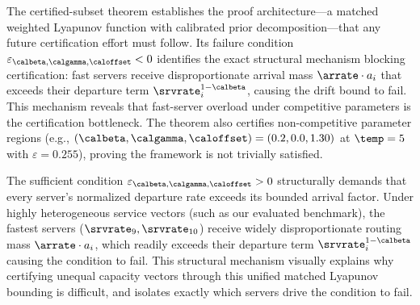 \begin{remark}
The certified-subset theorem establishes the proof architecture---a matched weighted Lyapunov function with calibrated prior decomposition---that any future certification effort must follow. Its failure condition $\varepsilon_{\calbeta,\calgamma,\caloffset}<0$ identifies the exact structural mechanism blocking certification: fast servers receive disproportionate arrival mass $\arrate \cdot a_i$ that exceeds their departure term $\srvrate_i^{1-\calbeta}$, causing the drift bound to fail. This mechanism reveals that fast-server overload under competitive parameters is the certification bottleneck. The theorem also certifies non-competitive parameter regions (e.g., $(\calbeta,\calgamma,\caloffset)=(0.2,0.0,1.30)$ at $\temp=5$ with $\varepsilon=0.255$), proving the framework is not trivially satisfied.
\end{remark}

\begin{remark}
The sufficient condition $\varepsilon_{\calbeta,\calgamma,\caloffset}>0$ structurally demands that every server's normalized departure rate exceeds its bounded arrival factor. Under highly heterogeneous service vectors (such as our evaluated benchmark), the fastest servers ($\srvrate_9, \srvrate_{10}$) receive widely disproportionate routing mass $\arrate \cdot a_i$, which readily exceeds their departure term $\srvrate_i^{1-\calbeta}$ causing the condition to fail. This structural mechanism visually explains why certifying unequal capacity vectors through this unified matched Lyapunov bounding is difficult, and isolates exactly which servers drive the condition to fail.
\end{remark}

